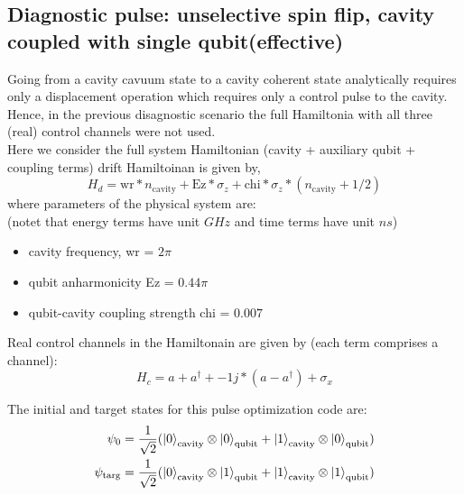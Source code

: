 \documentclass{article}
\begin{document}
\subsection{Diagnostic pulse: unselective spin flip, cavity coupled with single qubit(effective)}
Going from a cavity cavuum state to a cavity coherent state analytically requires only a displacement operation
which requires only a control pulse to the cavity. Hence, in the previous disagnostic scenario the full Hamiltonia
with all three (real) control channels were not used. 
\\
Here we consider the full system Hamiltonian (cavity + auxiliary qubit + coupling terms)
drift Hamiltoinan is given by, 
\begin{equation}
    H_d = \text{wr} * n_{\text{cavity}} + \text{Ez} * \sigma_z + \text{chi} * \sigma_z * (n_{\text{cavity}} + 1/2 )    
\end{equation}
where parameters of the physical system are:
\\
(notet that energy terms have unit $GHz$ and time terms have unit $ns$)
\begin{itemize}
    \item cavity frequency, wr = $2 \pi$
    \item qubit anharmonicity Ez = $0.44 \pi$
    \item qubit-cavity coupling strength chi = $0.007$
\end{itemize}

Real control channels in the Hamiltonain are given by (each term comprises a channel): 
\begin{equation}
    H_c = a + a^{\dagger} + -1j*(a - a^{\dagger}) + \sigma_x    
\end{equation}

The initial and target states for this pulse optimization code are: 
\begin{align*}
    \psi_0 &= \frac{1}{\sqrt{2}} (\ket{0}_{\text{cavity}} \otimes \ket{0}_{\text{qubit}} 
                + \ket{1}_{\text{cavity}} \otimes \ket{0}_{\text{qubit}})\\
    \psi_{\text{targ}} &= \frac{1}{\sqrt{2}} (\ket{0}_{\text{cavity}} \otimes \ket{1}_{\text{qubit}} 
                + \ket{1}_{\text{cavity}} \otimes \ket{1}_{\text{qubit}})\\
\end{align*}
\end{document}
